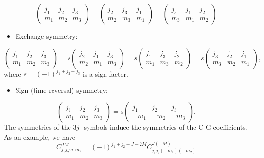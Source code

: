 \documentclass{article}
\begin{document}
	\begin{equation*}
		\left(\begin{matrix}
			j_{1} & j_{2} & j_{3}\\
			m_{1} & m_{2} & m_{3}
		\end{matrix}\right) =\left(\begin{matrix}
			j_{2} & j_{3} & j_{1}\\
			m_{2} & m_{3} & m_{1}
		\end{matrix}\right) =\left(\begin{matrix}
			j_{3} & j_{1} & j_{2}\\
			m_{3} & m_{1} & m_{2}
		\end{matrix}\right)
	\end{equation*}
	\begin{itemize}
		\item Exchange symmetry:
	\end{itemize}
	\begin{equation*}
		\left(\begin{matrix}
			j_{1} & j_{2} & j_{3}\\
			m_{1} & m_{2} & m_{3}
		\end{matrix}\right) =s\left(\begin{matrix}
			j_{2} & j_{1} & j_{3}\\
			m_{2} & m_{1} & m_{3}
		\end{matrix}\right) =s\left(\begin{matrix}
			j_{1} & j_{3} & j_{2}\\
			m_{1} & m_{3} & m_{2}
		\end{matrix}\right) =s\left(\begin{matrix}
			j_{3} & j_{2} & j_{1}\\
			m_{3} & m_{2} & m_{1}
		\end{matrix}\right) ,
	\end{equation*}
	where $s=(-1)^{j_{1} +j_{2} +j_{3}}$ is a sign factor.
	\begin{itemize}
		\item Sign (time reversal) symmetry:
	\end{itemize}
	\begin{equation*}
		\left(\begin{matrix}
			j_{1} & j_{2} & j_{3}\\
			m_{1} & m_{2} & m_{3}
		\end{matrix}\right) =s\left(\begin{matrix}
			j_{1} & j_{2} & j_{3}\\
			-m_{1} & -m_{2} & -m_{3}
		\end{matrix}\right) .
	\end{equation*}
	The symmetries of the $3j$ -symbols induce the symmetries of the C-G coefficients. As an example, we have
	\begin{equation*}
		C_{j_{1} j_{2} m_{1} m_{2}}^{JM} =( -1)^{j_{1} +j_{2} +J-2M} C_{j_{1} j_{2}( -m_{1})( -m_{2})}^{J(-M)}
	\end{equation*}
	
\end{document}
